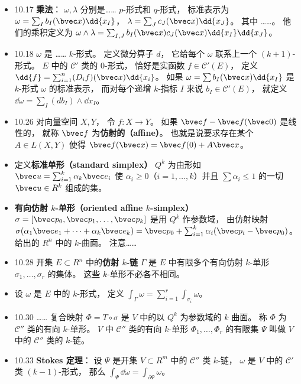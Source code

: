 \begin{itemize}
\item 10.17 \textbf{乘法}： $\omega,\lambda$ 分别是…… $p$-形式和 $q$-形式， 标准表示为 $\omega=\sum_I b_I(\bvec x)\dd{x_I}$， $\lambda=\sum_J c_J(\bvec x)\dd{x_J}$。 其中 ……。 他们的乘积定义为 $\omega\wedge\lambda = \sum_{I,J}b_I(\bvec x)c_J(\bvec x)\dd{x_I}\dd{x_J}$。

\item 10.18 $\omega$ 是 …… $k$-形式。 定义微分算子 $d$， 它给每个 $\omega$ 联系上一个 $(k+1)$-形式。 $E$ 中的 $\mathscr C'$ 类的 $0$-形式， 恰好是实函数 $f\in \mathscr C'(E)$， 定义 $\dd{f}=\sum_{i=1}^n (D_i f)(\bvec x)\dd{x_i}$。 如果 $\omega=\sum b_I(\bvec x)\dd{x_I}$ 是 $k$-形式 $\omega$ 的标准表示， 而对每个递增 $k$-指标 $I$ 来说 $b_I\in \mathscr C'(E)$， 就定义 $\dd{\omega} = \sum_I (db_I)\wedge \dd{x_I}$。

\item 10.26 对向量空间 $X,Y$， 令 $f:X\to Y$。 如果 $\bvec f-\bvec f(\bvec 0)$ 是线性的， 就称 $\bvec f$ 为\textbf{仿射的（affine）}。 也就是说要求存在某个 $A\in L(X,Y)$ 使得 $\bvec f(\bvec x) = \bvec f(0)+A\bvec x$。

\item 定义\textbf{标准单形（standard simplex）} $Q^k$ 为由形如 $\bvec u = \sum_{i=1}^k \alpha_k\bvec e_i$ 使 $\alpha_i\geqslant 0$（$i=1,\dots,k$）并且 $\sum \alpha_i\leqslant 1$ 的一切 $\bvec u\in R^k$ 组成的集。

\item \textbf{有向仿射 $k$-单形（oriented affine $k$-simplex）} $\sigma = [\bvec p_0,\bvec p_1,\dots,\bvec p_k]$ 是用 $Q^k$ 作参数域， 由仿射映射 $\sigma(\alpha_1\bvec e_1+\dots+\alpha_k\bvec e_k) = \bvec p_0 + \sum_{i=1}^k \alpha_i(\bvec p_i-\bvec p_0)$。 给出的 $R^n$ 中的 $k$-曲面。 注意……

\item 10.28 开集 $E\subset R^n$ 中的\textbf{仿射 $k$-链} $\Gamma$ 是 $E$ 中有限多个有向仿射 $k$-单形 $\sigma_1,\dots,\sigma_r$ 的集体。 这些 $k$-单形不必各不相同。

\item 设 $\omega$ 是 $E$ 中的 $k$-形式， 定义 $\int_\Gamma \omega = \sum_{i=1}^r \int_{\sigma_i}\omega$。

\item 10.30 …… 复合映射 $\Phi=T\circ\sigma$ 是 $V$ 中的以 $Q^k$ 为参数域的 $k$ 曲面。 称 $\Phi$ 为 $\mathscr C''$ 类的有向 $k$-单形。 $V$ 中 $\mathscr C''$ 类的有向 $k$-单形 $\Phi_1,\dots,\Phi_r$ 的有限集 $\Psi$ 叫做 $V$ 中的 $\mathscr C''$ 类的 $k$-链。

\item 10.33 \textbf{Stokes 定理}： 设 $\Psi$ 是开集 $V\subset R^m$ 中的 $\mathscr C''$ 类 $k$-链， $\omega$ 是 $V$ 中的 $\mathscr C'$ 类 $(k-1)$-形式， 那么 $\int_\Psi\dd{\omega}=\int_{\partial \Psi}\omega$。
\end{itemize}


